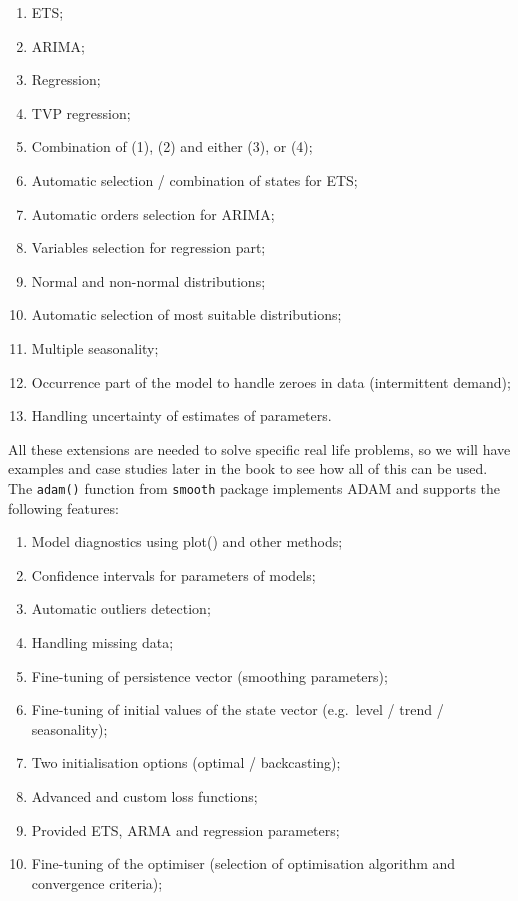 \documentclass[
]{book}
\providecommand{\tightlist}{%
  \setlength{\itemsep}{0pt}\setlength{\parskip}{0pt}}
\theoremstyle{definition}
\theoremstyle{definition}
\theoremstyle{definition}
\theoremstyle{definition}
\theoremstyle{remark}
\begin{document}
\begin{enumerate}
\def\labelenumi{\arabic{enumi}.}
\tightlist
\item
  ETS;
\item
  ARIMA;
\item
  Regression;
\item
  TVP regression;
\item
  Combination of (1), (2) and either (3), or (4);
\item
  Automatic selection / combination of states for ETS;
\item
  Automatic orders selection for ARIMA;
\item
  Variables selection for regression part;
\item
  Normal and non-normal distributions;
\item
  Automatic selection of most suitable distributions;
\item
  Multiple seasonality;
\item
  Occurrence part of the model to handle zeroes in data (intermittent demand);
\item
  Handling uncertainty of estimates of parameters.
\end{enumerate}

All these extensions are needed to solve specific real life problems, so we will have examples and case studies later in the book to see how all of this can be used. The \texttt{adam()} function from \texttt{smooth} package implements ADAM and supports the following features:

\begin{enumerate}
\def\labelenumi{\arabic{enumi}.}
\tightlist
\item
  Model diagnostics using plot() and other methods;
\item
  Confidence intervals for parameters of models;
\item
  Automatic outliers detection;
\item
  Handling missing data;
\item
  Fine-tuning of persistence vector (smoothing parameters);
\item
  Fine-tuning of initial values of the state vector (e.g.~level / trend / seasonality);
\item
  Two initialisation options (optimal / backcasting);
\item
  Advanced and custom loss functions;
\item
  Provided ETS, ARMA and regression parameters;
\item
  Fine-tuning of the optimiser (selection of optimisation algorithm and convergence criteria);
\end{enumerate}
\end{document}
